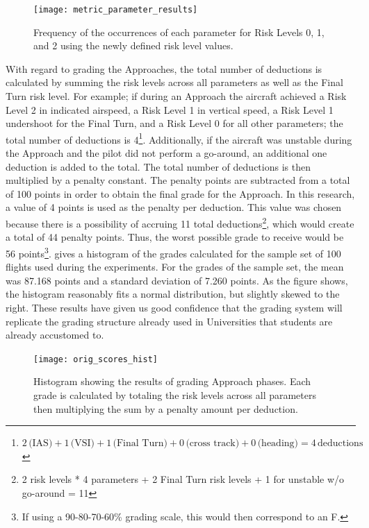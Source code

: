 	\begin{figure}
		\centering
		\texttt{[image: metric\_parameter\_results]}
		\caption{Frequency of the occurrences of each parameter for Risk Levels 0, 1, and 2 using the newly defined risk level values.}
		\label{fig:metric_parameter_results}
	\end{figure}
	
	
	With regard to grading the Approaches, the total number of deductions is calculated by summing the risk levels across all parameters as well as the Final Turn risk level.  For example; if during an Approach the aircraft achieved a Risk Level 2 in indicated airspeed, a Risk Level 1 in vertical speed, a Risk Level 1 undershoot for the Final Turn, and a Risk Level 0 for all other parameters; the total number of deductions is 4\footnote{$2\,\text{(IAS)} + 1\,\text{(VSI)} + 1\,\text{(Final Turn)} + 0\,\text{(cross track)} + 0\,\text{(heading)} = 4\,\text{deductions}$}.  Additionally, if the aircraft was unstable during the Approach and the pilot did not perform a go-around, an additional one deduction is added to the total.  The total number of deductions is then multiplied by a penalty constant.  The penalty points are subtracted from a total of 100 points in order to obtain the final grade for the Approach.  In this research, a value of 4 points is used as the penalty per deduction.  This value was chosen because there is a possibility of accruing 11 total deductions\footnote{2 risk levels * 4 parameters + 2 Final Turn risk levels + 1 for unstable w/o go-around = 11}, which would create a total of 44 penalty points.  Thus, the worst possible grade to receive would be 56 points\footnote{If using a 90-80-70-60\% grading scale, this would then correspond to an F.}.   gives a histogram of the grades calculated for the sample set of 100 flights used during the experiments.  For the grades of the sample set, the mean was 87.168 points and a standard deviation of 7.260 points.  As the figure shows, the histogram reasonably fits a normal distribution, but slightly skewed to the right.  These results have given us good confidence that the grading system will replicate the grading structure already used in Universities that students are already accustomed to.
	
	\begin{figure}
		\centering
		\texttt{[image: orig\_scores\_hist]}
		\caption{Histogram showing the results of grading Approach phases.  Each grade is calculated by totaling the risk levels across all parameters then multiplying the sum by a penalty amount per deduction.}
		\label{fig:scores_hist}
	\end{figure}
    
